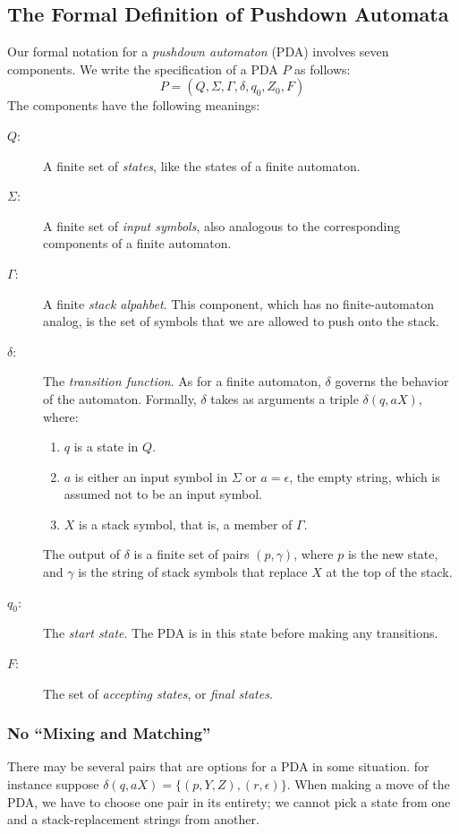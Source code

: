 \documentclass[]{article}
\begin{document}
  \subsection*{The Formal Definition of Pushdown Automata}
    Our formal notation for a \emph{pushdown automaton} (PDA) involves seven
    components. We write the specification of a PDA $P$ as follows:
      \[ P = (Q,\Sigma,\Gamma,\delta,q_0,Z_0,F) \]
    The components have the following meanings:
      \begin{description}
        \item[$Q$:] A finite set of \emph{states}, like the states of a finite
        automaton.
        \item[$\Sigma$:] A finite set of \emph{input symbols}, also analogous to
        the corresponding components of a finite automaton.
        \item[$\Gamma$:] A finite \emph{stack alpahbet}. This component, which
        has no finite-automaton analog, is the set of symbols that we are
        allowed to push onto the stack.
        \item[$\delta$:] The \emph{transition function}. As for a finite
        automaton, $\delta$ governs the behavior of the automaton. Formally, $
        \delta$ takes as arguments a triple $\delta(q,aX)$, where:
          \begin{enumerate}
            \item $q$ is a state in $Q$.
            \item $a$ is either an input symbol in $\Sigma$ or $a = \epsilon$,
            the empty string, which is assumed not to be an input symbol.
            \item $X$ is a stack symbol, that is, a member of $\Gamma$.
          \end{enumerate}
        The output of $\delta$ is a finite set of pairs $(p,\gamma)$, where $p$
        is the new state, and $\gamma$ is the string of stack symbols that
        replace $X$ at the top of the stack.
        \item[$q_0$:] The \emph{start state}. The PDA is in this state before
        making any transitions.
        \item[$F$:] The set of \emph{accepting states}, or \emph{final states}.
      \end{description}

    \subsubsection*{No ``Mixing and Matching''}
      There may be several pairs that are options for a PDA in some situation.
      for instance suppose $\delta(q,aX) = \{(p,Y,Z),(r,\epsilon)\}$. When
      making a move of the PDA, we have to choose one pair in its entirety; we
      cannot pick a state from one and a stack-replacement strings from another.
\end{document}
